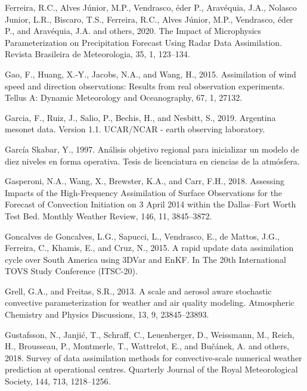 \documentclass[12pt,oneside,a4paper]{reedthesis}
\begin{document}
\leavevmode\hypertarget{ref-ferreira2020}{}%
Ferreira, R.C., Alves Júnior, M.P., Vendrasco, éder P., Aravéquia, J.A., Nolasco Junior, L.R., Biscaro, T.S., Ferreira, R.C., Alves Júnior, M.P., Vendrasco, éder P., and Aravéquia, J.A. and others, 2020. The Impact of Microphysics Parameterization on Precipitation Forecast Using Radar Data Assimilation. Revista Brasileira de Meteorologia, 35, 1, 123--134.

\leavevmode\hypertarget{ref-gao2015}{}%
Gao, F., Huang, X.-Y., Jacobs, N.A., and Wang, H., 2015. Assimilation of wind speed and direction observations: Results from real observation experiments. Tellus A: Dynamic Meteorology and Oceanography, 67, 1, 27132.

\leavevmode\hypertarget{ref-garcia2019}{}%
Garcia, F., Ruiz, J., Salio, P., Bechis, H., and Nesbitt, S., 2019. Argentina mesonet data. Version 1.1. UCAR/NCAR - earth observing laboratory.

\leavevmode\hypertarget{ref-garciaskabar1997}{}%
García Skabar, Y., 1997. Análisis objetivo regional para inicializar un modelo de diez niveles en forma operativa. Tesis de licenciatura en ciencias de la atmósfera.

\leavevmode\hypertarget{ref-gasperoni2018}{}%
Gasperoni, N.A., Wang, X., Brewster, K.A., and Carr, F.H., 2018. Assessing Impacts of the High-Frequency Assimilation of Surface Observations for the Forecast of Convection Initiation on 3 April 2014 within the Dallas--Fort Worth Test Bed. Monthly Weather Review, 146, 11, 3845--3872.

\leavevmode\hypertarget{ref-goncalvesdegoncalves2015}{}%
Goncalves de Goncalves, L.G., Sapucci, L., Vendrasco, E., de Mattos, J.G., Ferreira, C., Khamis, E., and Cruz, N., 2015. A rapid update data assimilation cycle over South America using 3DVar and EnKF. In The 20th International TOVS Study Conference (ITSC-20).

\leavevmode\hypertarget{ref-grell2013}{}%
Grell, G.A., and Freitas, S.R., 2013. A scale and aerosol aware stochastic convective parameterization for weather and air quality modeling. Atmospheric Chemistry and Physics Discussions, 13, 9, 23845--23893.

\leavevmode\hypertarget{ref-gustafsson2018}{}%
Gustafsson, N., Janjić, T., Schraff, C., Leuenberger, D., Weissmann, M., Reich, H., Brousseau, P., Montmerle, T., Wattrelot, E., and Bučánek, A. and others, 2018. Survey of data assimilation methods for convective‐scale numerical weather prediction at operational centres. Quarterly Journal of the Royal Meteorological Society, 144, 713, 1218--1256.
\end{document}
